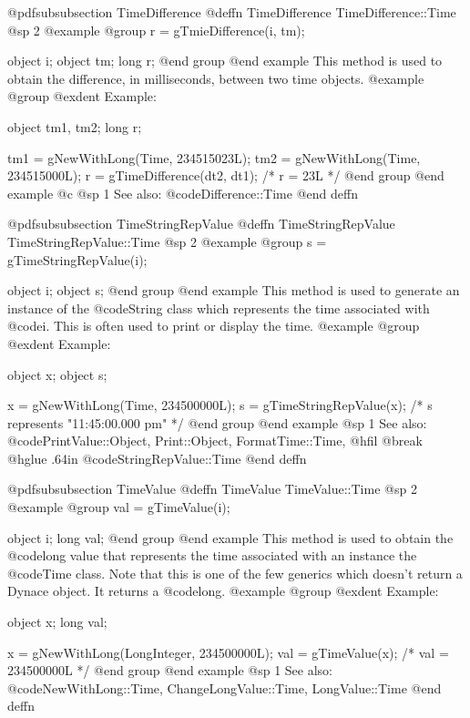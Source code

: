 @pdfsubsubsection {TimeDifference}
@deffn {TimeDifference} TimeDifference::Time
@sp 2
@example
@group
r = gTmieDifference(i, tm);

object  i;
object  tm;
long    r;
@end group
@end example
This method is used to obtain the difference, in milliseconds,
between two time objects.  
@example
@group
@exdent Example:

object  tm1, tm2;
long    r;

tm1 = gNewWithLong(Time, 234515023L);
tm2 = gNewWithLong(Time, 234515000L);
r = gTimeDifference(dt2, dt1);    /*  r = 23L  */
@end group
@end example
@c @sp 1
See also:  @code{Difference::Time}
@end deffn







@pdfsubsubsection {TimeStringRepValue}
@deffn {TimeStringRepValue} TimeStringRepValue::Time
@sp 2
@example
@group
s = gTimeStringRepValue(i);

object  i;
object  s;
@end group
@end example
This method is used to generate an instance of the @code{String} class
which represents the time associated with @code{i}.  This is often
used to print or display the time.
@example
@group
@exdent Example:

object  x;
object  s;

x = gNewWithLong(Time, 234500000L);
s = gTimeStringRepValue(x);
    /* s represents "11:45:00.000 pm"  */
@end group
@end example
@sp 1
See also:  @code{PrintValue::Object, Print::Object, FormatTime::Time,}
@hfil @break @hglue .64in      @code{StringRepValue::Time}
@end deffn










@pdfsubsubsection {TimeValue}
@deffn {TimeValue} TimeValue::Time
@sp 2
@example
@group
val = gTimeValue(i);

object  i;
long    val;
@end group
@end example
This method is used to obtain the @code{long} value that represents
the time associated with an instance the @code{Time} class.  Note that
this is one of the few generics which doesn't return a Dynace object.
It returns a @code{long}.
@example
@group
@exdent Example:

object  x;
long    val;

x = gNewWithLong(LongInteger, 234500000L);
val = gTimeValue(x);    /*  val = 234500000L  */
@end group
@end example
@sp 1
See also:  @code{NewWithLong::Time, ChangeLongValue::Time, LongValue::Time}
@end deffn










